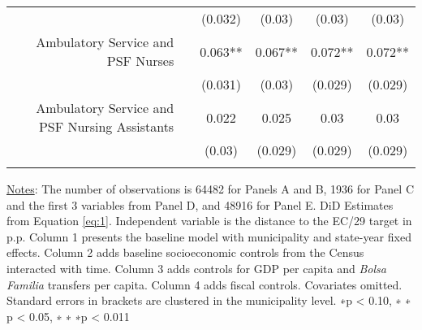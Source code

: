 \begin{table}[h!]
\begin{footnotesize}
\begin{center}
{\begin{threeparttable}[b]
\begin{tabular}{rrcccc}
          &       & (0.032) & (0.03) & (0.03) &  (0.03)  \\
    \multicolumn{1}{p{29.785em}}{Ambulatory Service and PSF Nurses} &       & 0.063** & 0.067** & 0.072** &  0.072**  \\
          &       & (0.031) & (0.03) & (0.029) &  (0.029)  \\
    \multicolumn{1}{p{29.785em}}{Ambulatory Service and PSF Nursing Assistants} &       & 0.022 & 0.025 & 0.03  &  0.03  \\
          &       & (0.03) & (0.029) & (0.029) &  (0.029)  \\
          &       &       &       &       &  \\
    \bottomrule
    \bottomrule
    \end{tabular}%
    
    
  \label{table:infra}%
  
  \begin{tablenotes}
  \scriptsize{\underline{Notes}: The number of observations is 64482 for Panels A and B,  1936 for Panel C and the first 3 variables from Panel D, and 48916 for Panel E.  DiD Estimates from Equation \ref{eq:1}. Independent variable is the distance to the EC/29 target in p.p. Column 1 presents the baseline model with municipality and state-year fixed effects. Column 2 adds baseline socioeconomic controls from the Census interacted with time. Column 3 adds controls for GDP per capita and \emph{Bolsa Familia} transfers per capita. Column 4 adds fiscal controls. Covariates omitted. Standard errors in brackets are clustered in the municipality level. ∗p < 0.10, ∗ ∗ p < 0.05, ∗ ∗ ∗p < 0.011}
  \end{tablenotes}

\end{threeparttable}
}
\end{center}
\end{footnotesize}
\end{table}